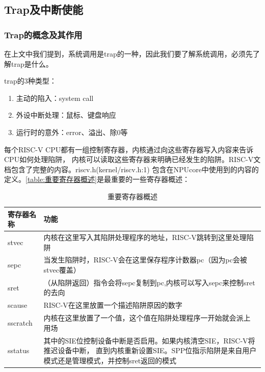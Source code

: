 \subsection{Trap及中断使能}

\subsubsection{Trap的概念及其作用}

在上文中我们提到，系统调用是trap的一种，因此我们要了解系统调用，必须先了解trap是什么。

trap的3种类型：
\begin{enumerate}
    \item 主动的陷入：system call
    \item 外设中断处理：鼠标、键盘响应
    \item 运行时的意外：error、溢出、除0等
\end{enumerate}

每个RISC-V CPU都有一组控制寄存器，内核通过向这些寄存器写入内容来告诉CPU如何处理陷阱，
内核可以读取这些寄存器来明确已经发生的陷阱。RISC-V文档包含了完整的内容。riscv.h(kernel/riscv.h:1)
包含在NPUcore中使用到的内容的定义。\autoref{table:重要寄存器概述}是最重要的一些寄存器概述：

\begin{table}[h]
    \centering
    \caption{重要寄存器概述}
    \label{table:重要寄存器概述}
    \begin{tabularx}{0.8\textwidth}{|p{2cm}|X|}
    \hline
    \textbf{寄存器名称} & \textbf{功能}                                                     \\\hline
    stvec    & 内核在这里写入其陷阱处理程序的地址，RISC-V跳转到这里处理陷阱                     \\\hline
    sepc     & 当发生陷阱时，RISC-V会在这里保存程序计数器pc（因为pc会被stvec覆盖）              \\\hline
    sret     & （从陷阱返回）指令会将sepc复制到pc,内核可以写入sepc来控制sret的去向              \\\hline
    scause   & RISC-V在这里放置一个描述陷阱原因的数字                                         \\\hline
    sscratch & 内核在这里放置了一个值，这个值在陷阱处理程序一开始就会派上用场                    \\\hline
    sstatus  & 其中的SIE位控制设备中断是否启用。如果内核清空SIE，RISC-V将推迟设备中断，          
               直到内核重新设置SIE。SPP位指示陷阱是来自用户模式还是管理模式，并控制sret返回的模式 \\\hline
    \end{tabularx}
\end{table}

